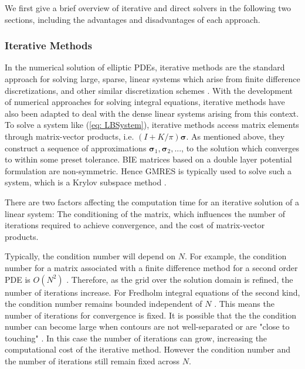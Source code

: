 \documentclass{sfuthesis}
\begin{document}
We first give a brief overview of iterative and direct solvers in the following two sections, including the advantages and disadvantages of each approach. 


\subsubsection{Iterative Methods}

In the numerical solution of elliptic PDEs, iterative methods are the standard approach for solving large, sparse, linear systems which arise from finite difference discretizations, and other similar discretization schemes \cite{Lev2007}. With the development of numerical approaches for solving integral equations, iterative methods have also been adapted to deal with the dense linear systems arising from this context. To solve a system like (\ref{eq: LBSystem}), iterative methods access matrix elements through matrix-vector products, i.e.  $(I+K/ \pi)\bm{\sigma}$. As mentioned above, they construct a sequence of approximations  $\bm{\sigma}_1,\bm{\sigma}_2, ...$, to the solution which converges to within some preset tolerance. BIE matrices based on a double layer potential formulation are non-symmetric. Hence GMRES is typically used to solve such a system, which is a Krylov subspace method \cite{Tref97}.

There are two factors affecting the computation time for an iterative solution of a linear system: The conditioning of the matrix, which influences the number of iterations required to achieve convergence, and the cost of matrix-vector products. 

Typically, the condition number will depend on $N$. For example, the condition number for a matrix associated with a finite difference method for a second order PDE is $O(N^2)$ \cite{Lev2007}. Therefore, as the grid over the solution domain is refined, the number of iterations increase. For Fredholm integral equations of the second kind, the condition number remains bounded independent of $N$ \cite{Atk97}. This means the number of iterations for convergence is fixed. It is possible that the the condition number can become large when contours are not well-separated or are "close to touching" \cite{HoGreen2012}. In this case the number of iterations can grow, increasing the computational cost of the iterative method. However the condition number and the number of iterations still remain fixed across $N$.
\end{document}
